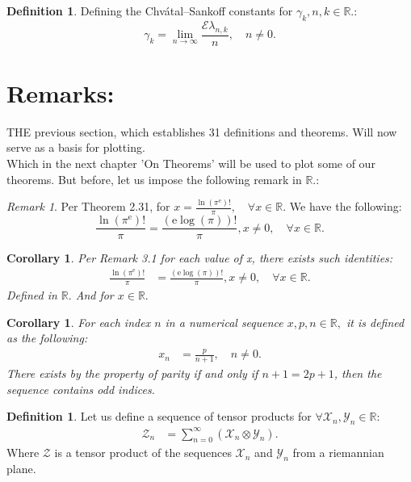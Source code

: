 \documentclass[10pt]{article}
\theoremstyle{plain}
\newtheorem{corollary}[theorem]{Corollary}
\theoremstyle{definition}
\newtheorem{definition}[theorem]{Definition}
\theoremstyle{remark}
\newtheorem{remark}[theorem]{Remark}
\begin{document}
\begin{definition}
	Defining the Chvátal–Sankoff constants for $\gamma_k, n, k \in \mathbb{R}.$:
	\begin{equation}
		\gamma_k = \lim_{n \to \infty} \frac{\mathrm{\mathcal{E}}{\lambda_{n, k}}}{n}, \quad n \neq 0.
	\end{equation}
\end{definition}

\section{Remarks:}
\lettrine[lines=2, lhang=0.1, loversize=0.2]{T}HE previous section, which establishes 31 definitions and theorems. Will now serve as a basis for plotting.\\
Which in the next chapter 'On Theorems' will be used to plot some of our theorems. But before, let us impose the following remark in $\mathbb{R}.$:

\begin{remark}
	Per Theorem 2.31, for $x = \frac{\ln(\pi^\mathrm{e})!}{\pi}, \quad \forall x \in \mathbb{R}.$ We have the following:
	\begin{equation}
		\frac{\ln(\pi^\mathrm{e})!}{\pi} = \frac{(\mathrm{e} \log(\pi))!}{\pi}, x \neq 0, \quad \forall x \in \mathbb{R}.
	\end{equation}
\end{remark}

\begin{corollary}
	Per Remark 3.1 for each value of x, there exists such identities:
	\begin{align*}
		\frac{\ln(\pi^\mathrm{e})!}{\pi} &= \frac{(\mathrm{e} \log(\pi))!}{\pi}, x \neq 0, \quad \forall x \in \mathbb{R}.
	\end{align*}
	Defined in $\mathbb{R}.$ And for $x \in \mathbb{R}.$
\end{corollary}

\begin{corollary}
	For each index $n$ in a numerical sequence $x, p, n \in \mathbb{R},$ it is defined as the following:
	\begin{align*}
		x_n &= \frac{p}{n+1}, \quad n \neq 0.
	\end{align*}
	There exists by the property of parity if and only if $n+1 = 2p + 1$, then the sequence contains  odd indices.
\end{corollary}

\begin{definition}
	Let us define a sequence of tensor products for $\forall \mathcal{X}_n, \mathcal{Y}_n \in \mathbb{R}$:
	\begin{align*}
		\mathcal{Z}_n &= \sum_{n=0}^{\infty} (\mathcal{X}_n \otimes \mathcal{Y}_{n}).
	\end{align*}
	Where $\mathcal{Z}$ is a tensor product of the sequences $\mathcal{X}_n$ and $\mathcal{Y}_n$ from a riemannian plane.
\end{definition}
\end{document}
